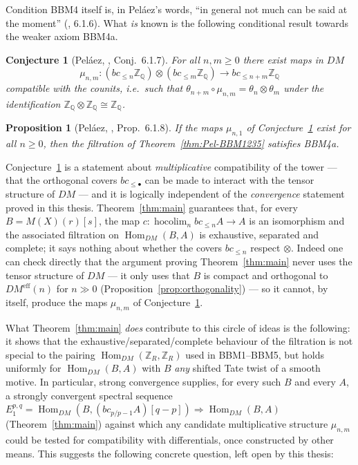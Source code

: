 \documentclass[12pt,a4paper]{article}
\newtheorem{proposition}[theorem]{Proposition}
\newtheorem{conjecture}[theorem]{Conjecture}
\theoremstyle{definition}
\newcommand{\hocolim}{\operatorname*{hocolim}}
\newcommand{\Hom}{\operatorname{Hom}}
\newcommand{\Z}{\mathbb{Z}}
\newcommand{\Q}{\mathbb{Q}}
\begin{document}
Condition BBM4 itself is, in Peláez's words, ``in general not much can be said at
the moment'' (\cite{Pel17}, 6.1.6).  What \emph{is} known is the following
conditional result towards the weaker axiom BBM4a.

\begin{conjecture}[Peláez, \cite{Pel17}, Conj.~6.1.7]\label{conj:Pel-multiplicative}
For all $n,m\geq 0$ there exist maps in $DM$
\[
  \mu_{n,m} : (bc_{\leq n}\Z_\Q)\otimes(bc_{\leq m}\Z_\Q)\longrightarrow bc_{\leq n+m}\Z_\Q
\]
compatible with the counits, i.e.\ such that
$\theta_{n+m}\circ\mu_{n,m} = \theta_n\otimes\theta_m$ under the identification
$\Z_\Q\otimes\Z_\Q\cong\Z_\Q$.
\end{conjecture}

\begin{proposition}[Peláez, \cite{Pel17}, Prop.~6.1.8]\label{prop:Pel-BBM4a}
If the maps $\mu_{n,1}$ of Conjecture~\ref{conj:Pel-multiplicative} exist for all
$n\geq 0$, then the filtration of Theorem~\ref{thm:Pel-BBM1235} satisfies BBM4a.
\end{proposition}

Conjecture~\ref{conj:Pel-multiplicative} is a statement about \emph{multiplicative}
compatibility of the tower — that the orthogonal covers $bc_{\leq\bullet}$ can be
made to interact with the tensor structure of $DM$ — and it is logically
independent of the \emph{convergence} statement proved in this thesis.
Theorem~\ref{thm:main} guarantees that, for every $B=M(X)(r)[s]$, the map
$c:\hocolim_n bc_{\leq n}A\to A$ is an isomorphism and the associated filtration
on $\Hom_{DM}(B,A)$ is exhaustive, separated and complete; it says nothing about
whether the covers $bc_{\leq n}$ respect $\otimes$.  Indeed one can check directly
that the argument proving Theorem~\ref{thm:main} never uses the tensor structure
of $DM$ — it only uses that $B$ is compact and orthogonal to
$DM^{\mathrm{eff}}(n)$ for $n\gg 0$ (Proposition~\ref{prop:orthogonality}) — so
it cannot, by itself, produce the maps $\mu_{n,m}$ of
Conjecture~\ref{conj:Pel-multiplicative}.

What Theorem~\ref{thm:main} \emph{does} contribute to this circle of ideas is the
following: it shows that the exhaustive/separated/complete behaviour of the
filtration is not special to the pairing $\Hom_{DM}(\Z_R,\Z_R)$ used in BBM1–BBM5,
but holds uniformly for $\Hom_{DM}(B,A)$ with $B$ \emph{any} shifted Tate twist of
a smooth motive.  In particular, strong convergence supplies, for every such $B$
and every $A$, a strongly convergent spectral sequence
$E_1^{p,q}=\Hom_{DM}(B,(bc_{p/p-1}A)[q-p])\Rightarrow\Hom_{DM}(B,A)$
(Theorem~\ref{thm:main}) against which any candidate multiplicative structure
$\mu_{n,m}$ could be tested for compatibility with differentials, once
constructed by other means.  This suggests the following concrete question, left
open by this thesis:
\end{document}
